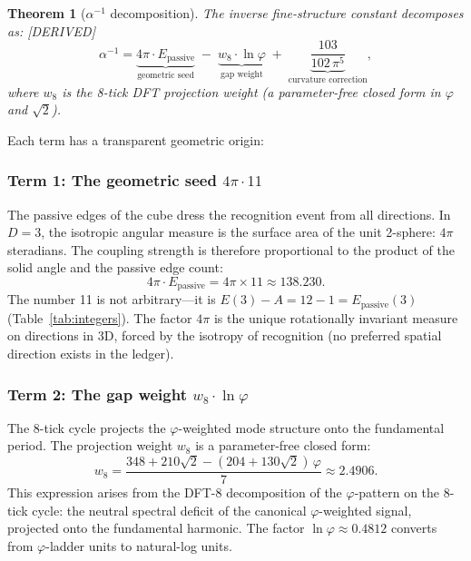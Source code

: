 \documentclass[11pt,a4paper]{article}
\newtheorem{theorem}{Theorem}[section]
\theoremstyle{definition}
\theoremstyle{remark}
\newcommand{\phig}{\varphi}
\newcommand{\Epass}{E_{\mathrm{passive}}}
\newcommand{\weig}{w_8}
\newcommand{\DERIVED}{\textcolor{blue!70!black}{\footnotesize\textsf{[DERIVED]}}}
\begin{document}
\begin{theorem}[$\alpha^{-1}$ decomposition]
\label{thm:alpha_decomp}
The inverse fine-structure constant decomposes as: \DERIVED{}
\begin{equation}
  \boxed{\alpha^{-1}
    = \underbrace{4\pi \cdot \Epass}_{\text{geometric seed}}
    \;-\; \underbrace{\weig \cdot \ln\phig}_{\text{gap weight}}
    \;+\; \underbrace{\frac{103}{102\,\pi^5}}_{\text{curvature correction}},}
  \label{eq:alpha_inv}
\end{equation}
where $\weig$ is the 8-tick DFT projection weight (a parameter-free
closed form in $\phig$ and $\sqrt{2}$).
\end{theorem}

\noindent
Each term has a transparent geometric origin:

\subsubsection{Term 1: The geometric seed $4\pi \cdot 11$}

The passive edges of the cube dress the recognition event from all directions.
In $D = 3$, the isotropic angular measure is the surface area of the unit
2-sphere: $4\pi$ steradians.  The coupling strength is therefore proportional
to the product of the solid angle and the passive edge count:
\begin{equation}
  4\pi \cdot \Epass = 4\pi \times 11 \approx 138.230.
  \label{eq:seed}
\end{equation}
The number 11 is not arbitrary---it is $E(3) - A = 12 - 1 = \Epass(3)$
(Table~\ref{tab:integers}).  The factor $4\pi$ is the unique rotationally
invariant measure on directions in 3D, forced by the isotropy of recognition
(no preferred spatial direction exists in the ledger).

\subsubsection{Term 2: The gap weight $\weig \cdot \ln\phig$}

The 8-tick cycle projects the $\phig$-weighted mode structure onto the
fundamental period.  The projection weight $\weig$ is a parameter-free
closed form:
\begin{equation}
  \weig = \frac{348 + 210\sqrt{2} - (204 + 130\sqrt{2})\,\phig}{7}
  \approx 2.4906.
  \label{eq:w8}
\end{equation}
This expression arises from the DFT-8 decomposition of the $\phig$-pattern
on the 8-tick cycle: the neutral spectral deficit of the
canonical $\phig$-weighted signal, projected onto the fundamental harmonic.
The factor $\ln\phig \approx 0.4812$ converts from $\phig$-ladder units to
natural-log units.
\end{document}

